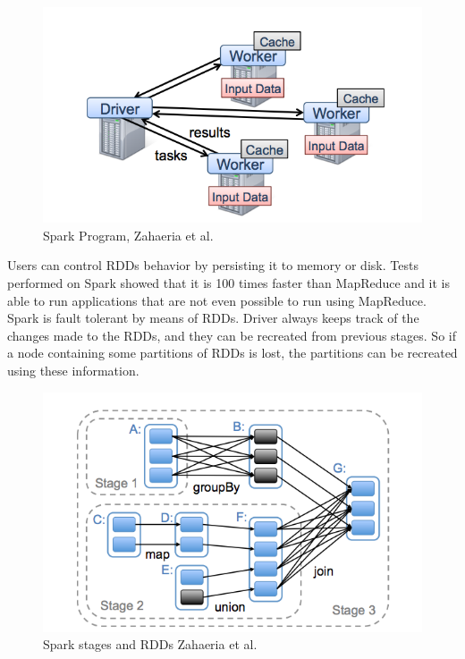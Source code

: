 \documentclass[english]{tktltiki}
\begin{document}
\begin{figure}[ht!]
\centering
\includegraphics[width=150mm]{figures/sparkprogram.png}
\caption[]{Spark Program, Zahaeria et al.\ \cite{zaharia10}}
\label{fig:sparkprogram}
\end{figure}

Users can control RDDs behavior by persisting it to memory or disk. Tests performed on Spark showed that it is 100 times faster than MapReduce and it is able to run applications that are not even possible to run using MapReduce. Spark is fault tolerant by means of RDDs. Driver always keeps track of the changes made to the RDDs, and they can be recreated from previous stages. So if a node containing some partitions of RDDs is lost, the partitions can be recreated using these information. 
 
\begin{figure}[ht!]
\centering
\includegraphics[width=150mm]{figures/rdd.png}
\caption[]{Spark stages and RDDs  Zahaeria et al.\ \cite{zaharia12} }
\label{fig:rdd}
\end{figure}
\end{document}
